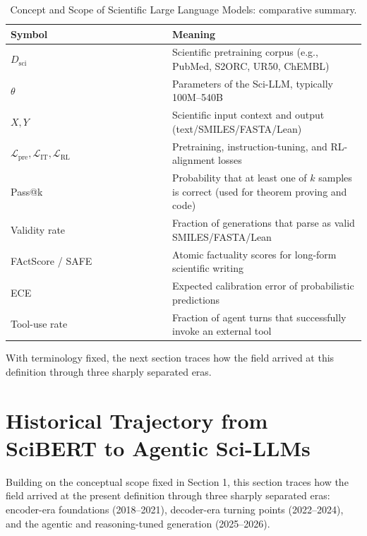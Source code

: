 \documentclass{article}
\begin{document}
\begin{table}[t]
\centering
\caption{Concept and Scope of Scientific Large Language Models: comparative summary.}
\label{tab:concept-and-scope-of-scientific-large-language-models}
\begin{tabular}{>{\raggedright\arraybackslash}p{0.4551\linewidth}
  >{\raggedright\arraybackslash}p{0.5449\linewidth}}
\toprule
Symbol & Meaning \\
\midrule
\(D_{\text{sci}}\) & Scientific pretraining corpus (e.g., PubMed, S2ORC, UR50, ChEMBL) \\
\(\theta\) & Parameters of the Sci-LLM, typically 100M--540B \\
\(X, Y\) & Scientific input context and output (text/SMILES/FASTA/Lean) \\
\(\mathcal{L}_{\text{pre}}, \mathcal{L}_{\text{IT}}, \mathcal{L}_{\text{RL}}\) & Pretraining, instruction-tuning, and RL-alignment losses \\
Pass@k & Probability that at least one of \(k\) samples is correct (used for theorem proving and code) \\
Validity rate & Fraction of generations that parse as valid SMILES/FASTA/Lean \\
FActScore / SAFE & Atomic factuality scores for long-form scientific writing \\
ECE & Expected calibration error of probabilistic predictions \\
Tool-use rate & Fraction of agent turns that successfully invoke an external tool \\
\end{tabular}
\end{table}

With terminology fixed, the next section traces how the field arrived at this definition through three sharply separated eras.

\section{Historical Trajectory from SciBERT to Agentic Sci-LLMs}\label{historical-trajectory-from-scibert-to-agentic-sci-llms}

Building on the conceptual scope fixed in Section 1, this section traces how the field arrived at the present definition through three sharply separated eras: encoder-era foundations (2018--2021), decoder-era turning points (2022--2024), and the agentic and reasoning-tuned generation (2025--2026).
\end{document}
